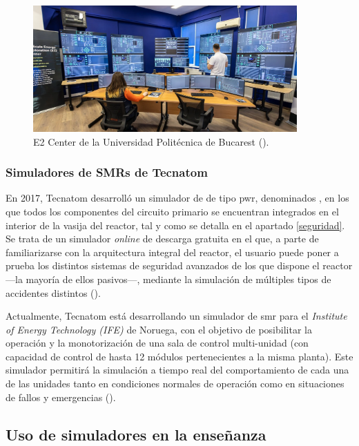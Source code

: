 \begin{figure}[h!]
  \centering
  \includegraphics[width=0.9\textwidth]{content/figures/e2_center_bucarest.png}
  \caption{E2 Center de la Universidad Politécnica de Bucarest (\cite{e2_center_romania}).}
  \label{fig:e2_center_bucarest}
\end{figure}

\subsubsection{Simuladores de SMRs de Tecnatom}

En 2017, Tecnatom desarrolló un simulador de  de tipo \acrshort{pwr}, denominados , en los que todos los componentes del circuito primario se encuentran integrados en el interior de la vasija del reactor, tal y como se detalla en el apartado \ref{seguridad}. Se trata de un simulador \textit{online} de descarga gratuita en el que, a parte de familiarizarse con la arquitectura integral del reactor, el usuario puede poner a prueba los distintos sistemas de seguridad avanzados de los que dispone el reactor ---la mayoría de ellos pasivos---, mediante la simulación de múltiples tipos de accidentes distintos (\cite{ipwr_iaea}).

Actualmente, Tecnatom está desarrollando un simulador de \acrshort{smr} para el \textit{Institute of Energy Technology (IFE)} de Noruega, con el objetivo de posibilitar la operación y la monotorización de una sala de control multi-unidad (con capacidad de control de hasta 12 módulos pertenecientes a la misma planta). Este simulador permitirá la simulación a tiempo real del comportamiento de cada una de las unidades tanto en condiciones normales de operación como en situaciones de fallos y emergencias (\cite{tecnatom_smr_simulator}). 


\subsection{Uso de simuladores en la enseñanza}


